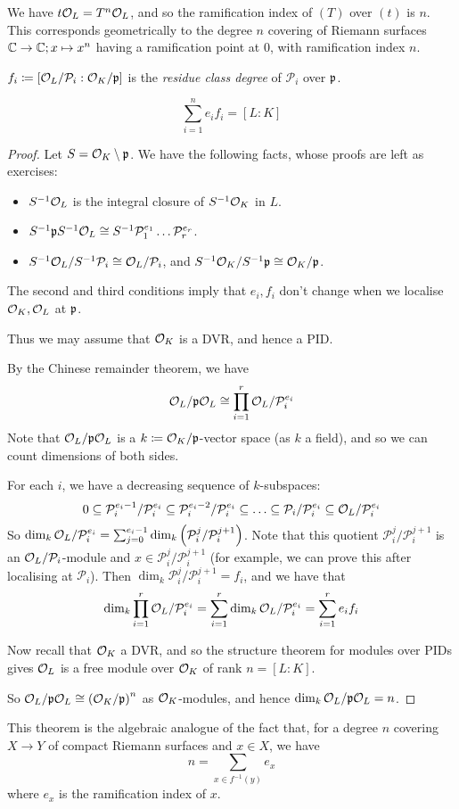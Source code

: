 \documentclass[10pt,a4paper]{article}
\begin{document}
We have $t\mathcal{O}_L = T^n\mathcal{O}_L$, and so the ramification index of $(T)$ over $(t)$ is $n$. This corresponds geometrically to the degree $n$ covering of Riemann surfaces $\mathbb{C}\to \mathbb{C}; x \mapsto x^n$ having a ramification point at 0, with ramification index $n$.

\begin{definition}
  $f_i \coloneqq [\mathcal{O}_L/\mathcal{P}_i : \mathcal{O}_K/\mathfrak{p}]$ is the \emph{residue class degree} of $\mathcal{P}_i$ over $\mathfrak{p}$.
\end{definition}
\begin{theorem}
  \[\sum_{i=1}^n e_if_i = [L:K]\]
\end{theorem}
\begin{proof}
  Let $S = \mathcal{O}_K \setminus \mathfrak{p}$. We have the following facts, whose proofs are left as exercises:
  \begin{itemize}
    \item $S^{-1}\mathcal{O}_L$ is the integral closure of $S^{-1}\mathcal{O}_K$ in $L$.
    \item $S^{-1}\mathfrak{p} S^{-1}\mathcal{O}_L \cong S^{-1}\mathcal{P}_1^{e_1}\ldots \mathcal{P}_r^{e_r}$.
    \item $S^{-1}\mathcal{O}_L/S^{-1}\mathcal{P}_i \cong \mathcal{O}_L/\mathcal{P}_i$, and $S^{-1}\mathcal{O}_K/S^{-1}\mathfrak{p} \cong \mathcal{O}_K/\mathfrak{p}$.
  \end{itemize}
  The second and third conditions imply that $e_i, f_i$ don't change when we localise $\mathcal{O}_K, \mathcal{O}_L$ at $\mathfrak{p}$.

  Thus we may assume that $\mathcal{O}_K$ is a DVR, and hence a PID.

  By the Chinese remainder theorem, we have
  \[\mathcal{O}_L/\mathfrak{p}\mathcal{O}_L \cong \prod_{i=1}^r \mathcal{O}_L/\mathcal{P}_i^{e_i}\]
  Note that $\mathcal{O}_L/\mathfrak{p}\mathcal{O}_L$ is a $k \coloneqq \mathcal{O}_K/\mathfrak{p}$-vector space (as $k$ a field), and so we can count dimensions of both sides.

  For each $i$, we have a decreasing sequence of $k$-subspaces:
  \[0 \subseteq \mathcal{P}_i^{e_i-1}/\mathcal{P}_i^{e_i} \subseteq \mathcal{P}_i^{e_i-2}/\mathcal{P}_i^{e_i} \subseteq \ldots \subseteq \mathcal{P}_i/\mathcal{P}_i^{e_i} \subseteq \mathcal{O}_L/\mathcal{P}_i^{e_i}\]
  So $\dim_k \mathcal{O}_L/\mathcal{P}_i^{e_i} = \sum_{j=0}^{e_i-1}\dim_k\left(\mathcal{P}_i^j/\mathcal{P}_i^{j+1}\right)$. Note that this quotient $\mathcal{P}_i^j/\mathcal{P}_i^{j+1}$ is an $\mathcal{O}_L/\mathcal{P}_i$-module and $x \in \mathcal{P}_i^j/\mathcal{P}_i^{j+1}$ (for example, we can prove this after localising at $\mathcal{P}_i$).
  Then $\dim_k \mathcal{P}_i^j/\mathcal{P}_i^{j+1} = f_i$, and we have that
  \[\dim_k \prod_{i=1}^r \mathcal{O}_L/\mathcal{P}_i^{e_i} = \sum_{i=1}^r \dim_k \mathcal{O}_L/\mathcal{P}_i^{e_i} = \sum_{i=1}^r e_if_i\]

  Now recall that $\mathcal{O}_K$ a DVR, and so the structure theorem for modules over PIDs gives $\mathcal{O}_L$ is a free module over $\mathcal{O}_K$ of rank $n = [L:K]$.

  So $\mathcal{O}_L/\mathfrak{p}\mathcal{O}_L \cong \left(\mathcal{O}_K/\mathfrak{p}\right)^n$ as $\mathcal{O}_K$-modules, and hence $\dim_k \mathcal{O}_L/\mathfrak{p}\mathcal{O}_L = n$.
\end{proof}
This theorem is the algebraic analogue of the fact that, for a degree $n$ covering $X \to Y$ of compact Riemann surfaces and $x \in X$, we have
\[n = \sum_{x \in f^{-1}(y)} e_x\]
where $e_x$ is the ramification index of $x$.
\end{document}
